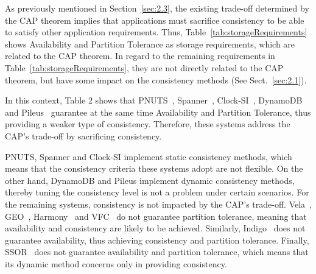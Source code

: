 As previously mentioned in Section~\ref{sec:2.3}, the existing trade-off determined by the CAP theorem implies that applications must sacrifice consistency to be able to satisfy other application requirements. Thus, Table~\ref{tab:storageRequirements} shows Availability and Partition Tolerance as storage requirements, which are related to the CAP theorem. In regard to the remaining requirements in Table~\ref{tab:storageRequirements}, they are not directly related to the CAP theorem,
but have some impact on the consistency methods (See Sect.~\ref{sec:2.1}). 

In this context, Table 2 shows that PNUTS~\cite{cooper2008pnuts}, Spanner~\cite{Corbett:2013}, Clock-SI~\cite{Du2013}, DynamoDB~\cite{sivasubramanian2012amazon} and Pi\-leus~\cite{Terry:2013} guarantee at the same time Availability and Partition Tolerance, thus providing a weaker type of consistency.
Therefore, these systems address the CAP's trade-off by sacrificing consistency. 

PNUTS, Spanner and Clock-SI implement static consistency methods, %
which means that the consistency criteria these systems adopt are not flexible. 
On the other hand, DynamoDB and Pileus implement dynamic consistency methods, thereby tuning the consistency level is not a problem under certain scenarios. For the remaining systems, consistency is not impacted by the CAP's trade-off. Vela~\cite{salomie2015scaling}, GEO~\cite{BernsteinBBCFKK17}, Harmony~\cite{chihoub2012harmony} and VFC~\cite{esteves2012quality} do not guarantee partition tolerance, meaning that availability and consistency are likely to be achieved. Similarly, Indigo~\cite{balegas2015putting} does not guarantee availability, thus achieving consistency and partition tolerance. Finally, SSOR~\cite{Chen:2014} does not guarantee availability and partition tolerance, which means that its dynamic method concerns only in providing consistency.

